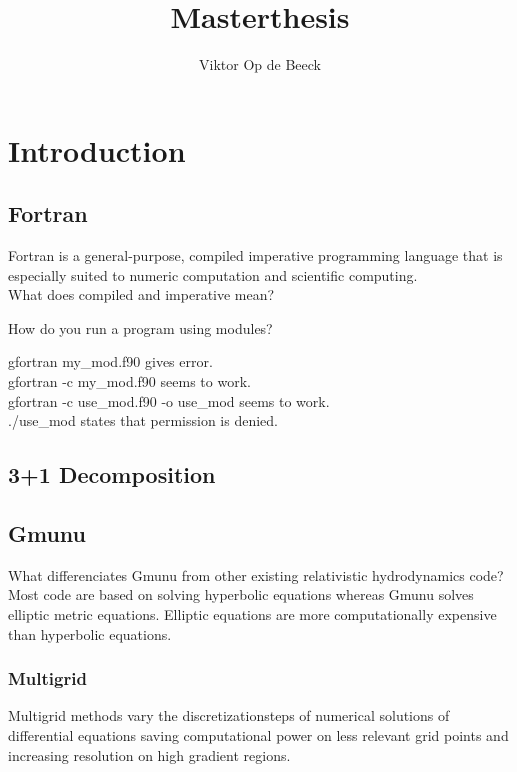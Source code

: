 \documentclass[a4paper]{article}
\title{Masterthesis}
\author{Viktor Op de Beeck}
\begin{document}
\maketitle

\section{Introduction}
\subsection{Fortran}
Fortran is a general-purpose, compiled imperative programming language that is especially suited to numeric computation and scientific computing.
\\
What does compiled and imperative mean?

How do you run a program using modules?

gfortran my\_mod.f90 gives error.\\
gfortran -c my\_mod.f90 seems to work.\\
gfortran -c use\_mod.f90 -o use\_mod seems to work.\\
./use\_mod states that permission is denied.

\subsection{3+1 Decomposition}
\subsection{Gmunu}
What differenciates Gmunu from other existing relativistic hydrodynamics code?
Most code are based on solving hyperbolic equations whereas Gmunu solves elliptic metric equations. Elliptic equations are more computationally expensive than hyperbolic equations.
\subsubsection{Multigrid}
Multigrid methods vary the discretizationsteps of numerical solutions of differential equations saving computational power on less relevant grid points and increasing resolution on high gradient regions.
\end{document}

